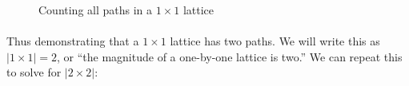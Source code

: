\documentclass[12pt]{article}
\newcommand{\p}{\paragraph{}}
\begin{document}
			\begin{figure}[h]
				\centering
				\begin{subfigure}{.5\textwidth}
					\centering
				\end{subfigure}%
				\begin{subfigure}{.5\textwidth}
					\centering
				\end{subfigure}
			
				\caption{Counting all paths in a $1\times1$ lattice}
			\end{figure}
		
			\p Thus demonstrating that a $1\times1$ lattice has two paths. We will write this as $|1\times1|=2$, or ``the magnitude of a one-by-one lattice is two.'' We can repeat this to solve for $|2\times2|$:
			
\end{document}
